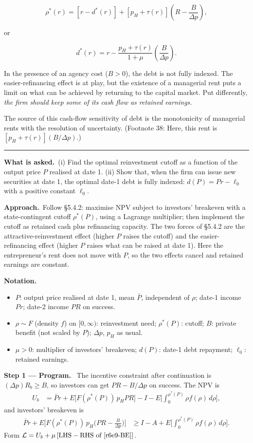 \documentclass[11pt,a4paper]{article}
\newcommand{\notation}{\par\noindent\textbf{Notation.}}
\newcommand{\step}[2]{\par\medskip\noindent\textbf{Step #1 --- #2.}~}
\newcommand{\asked}{\par\medskip\noindent\textbf{What is asked.}~}
\newcommand{\approach}{\par\smallskip\noindent\textbf{Approach.}~}
\newcommand{\stmtend}{\par\endgroup\nopagebreak\noindent\rule{\linewidth}{0.4pt}\par\medskip}
\begin{document}
\[\rho^*(r) = [r - d^*(r)] + [p_H + \tau(r)]\left(R - \frac{B}{\Delta p}\right),\]

or

\[d^*(r) = r - \frac{p_H + \tau(r)}{1 + \mu}\left(\frac{B}{\Delta p}\right).\]

In the presence of an agency cost (\(B > 0\)), the debt is not fully indexed. The easier-refinancing
effect is at play, but the existence of a managerial rent puts a limit on what can be achieved by
returning to the capital market. Put differently, \emph{the firm should keep some of its cash flow
as retained earnings.}

The source of this cash-flow sensitivity of debt is the monotonicity of managerial rents with the
resolution of uncertainty. (Footnote 38: Here, this rent is \([p_H + \tau(r)](B/\Delta p)\).)
\stmtend

\asked (i) Find the optimal reinvestment cutoff as a function of the output price $P$ realised at date 1. (ii) Show that, when the firm can issue new securities at date 1, the optimal date-1 debt is fully indexed: $d(P)=Pr-\ell_0$ with a positive constant $\ell_0$.

\approach Follow \S 5.4.2: maximise NPV subject to investors' breakeven with a state-contingent cutoff $\rho^*(P)$, using a Lagrange multiplier; then implement the cutoff as retained cash plus refinancing capacity. The two forces of \S 5.4.2 are the attractive-reinvestment effect (higher $P$ raises the cutoff) and the easier-refinancing effect (higher $P$ raises what can be raised at date 1). Here the entrepreneur's rent does not move with $P$, so the two effects cancel and retained earnings are constant.

\notation
\begin{itemize}
  \item $P$: output price realised at date 1, mean $\bar P$, independent of $\rho$; date-1 income $Pr$; date-2 income $PR$ on success.
  \item $\rho\sim F$ (density $f$) on $[0,\infty)$: reinvestment need; $\rho^*(P)$: cutoff; $B$: private benefit (not scaled by $P$); $\Delta p$, $p_H$ as usual.
  \item $\mu>0$: multiplier of investors' breakeven; $d(P)$: date-1 debt repayment; $\ell_0$: retained earnings.
\end{itemize}

\step{1}{Program} The incentive constraint after continuation is $(\Delta p)R_b\ge B$, so investors can get $PR-B/\Delta p$ on success. The NPV is
\begin{align}
  U_b &= \bar Pr+E\big[F(\rho^*(P))\,p_HPR\big]-I-E\Big[\int_0^{\rho^*(P)}\rho f(\rho)\,d\rho\Big], \label{r6e9-U}
\end{align}
and investors' breakeven is
\begin{align}
  \bar Pr+E\Big[F(\rho^*(P))\,p_H\Big(PR-\frac{B}{\Delta p}\Big)\Big] &\ge I-A+E\Big[\int_0^{\rho^*(P)}\rho f(\rho)\,d\rho\Big]. \label{r6e9-BE}
\end{align}
Form $\mathcal L=U_b+\mu\,[\text{LHS}-\text{RHS of }\eqref{r6e9-BE}]$.
\end{document}
